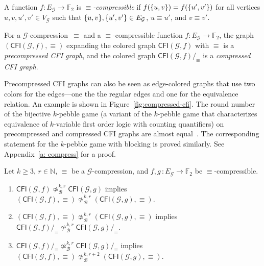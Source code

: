 \documentclass[a4paper,english, thm-restate]{lipics-v2021}
\newcommand{\defining}[1]{\emph{#1}}
\DeclarePairedDelimiter\set{\lbrace}{\rbrace}
\newcommand{\comp}{\equiv}
\newcommand{\CFIsym}{\mathsf{CFI}}
\newcommand{\CFI}[1]{\CFIsym(#1)}
\newcommand{\compCFI}[2]{\CFI{#1}/_{#2}}
\newcommand{\precompCFI}[2]{{(\CFI{#1},#2)}}
\newcommand{\nat}{\mathbb{N}}
\newcommand{\FF}{\mathbb{F}}
\newcommand{\graphG}{\mathcal{G}}
\newcommand{\vertexG}{V_{\graphG}}
\newcommand{\edgeG}{E_{\graphG}}
\newcommand{\notkbequivr}[2]{\not\simeq_{\mathcal{B}}^{#1,#2}}
\newcommand{\ifAppendix}[1]{#1}
\begin{document}
\begin{definition}[Compressible]
        A function $f\colon \edgeG \to \FF_2$ is \defining{$\comp$-compressible}
        if $f(\set{u,v}) = f(\set{u',v'})$ for all vertices $u,v,u',v' \in \vertexG$
        such that  $\set{u,v},
        \set{u',v'} \in \edgeG$,
        $u \comp u'$, and
        $v \comp v'$.
\end{definition}

\begin{definition}
        For a $\graphG$-compression~$\comp$ and a $\comp$\nobreakdash-compressible function ${f \colon \edgeG \to \FF_2}$,
        the graph $\precompCFI{\graphG,f}{\comp}$ expanding the colored graph $\CFI{\graphG,f}$ with 
       $\comp$ is a \defining{precompressed CFI graph}, and
                the colored graph $\compCFI{\graphG,f}{\comp}$ is a \defining{compressed CFI graph}.
\end{definition}

\noindent Precompressed CFI graphs can also be seen as edge-colored graphs that use two colors for the edges---one the the regular edges and one for the equivalence relation. An example is shown in Figure~\ref{fig:compressed-cfi}.
The round number of the bijective $k$-pebble game (a variant of the $k$-pebble game that characterizes equivalence of $k$-variable first order logic with counting quantifiers) on precompressed and compressed CFI graphs are almost equal~\cite{DBLP:conf/focs/GroheLNS23}.
The corresponding statement for the $k$-pebble game with blocking is proved similarly. \ifAppendix{See Appendix~\ref{a: compress} for a proof.}
\begin{lemma}
        \label{lem:precomp-comp-same-number-of-round}
        Let $k\geq 3$, $r\in\nat$, $\comp$ be a $\graphG$-compression, and
         $f,g \, \colon \edgeG \to \FF_2$ be $\comp$\nobreakdash-compressible.
        \begin{enumerate}
                \item $\CFI{\graphG,f} \notkbequivr{k}{r} \CFI{\graphG,g}$
                implies $\precompCFI{\graphG,f}{\comp} \notkbequivr{k}{r} \precompCFI{\graphG,g}{\comp}$.
                \item \label{claim:precomp_implies_comp} $\precompCFI{\graphG,f}{\comp} \notkbequivr{k}{r} \precompCFI{\graphG,g}{\comp}$
                implies $\compCFI{\graphG,f}{\comp} \notkbequivr{k}{r} \compCFI{\graphG,g}{\comp}$.
                \item $\compCFI{\graphG,f}{\comp} \notkbequivr{k}{r} \compCFI{\graphG,g}{\comp}$ implies
                $\precompCFI{\graphG,f}{\comp} \notkbequivr{k}{r+2} \precompCFI{\graphG,g}{\comp}$.
        \end{enumerate}
\end{lemma}
\end{document}
